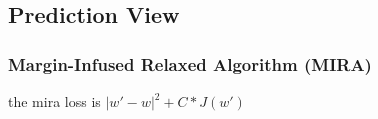 \subsection{Prediction View}


\subsubsection{Margin-Infused Relaxed Algorithm (MIRA)}
the mira loss is $|w' - w|^2 + C * J(w')$
